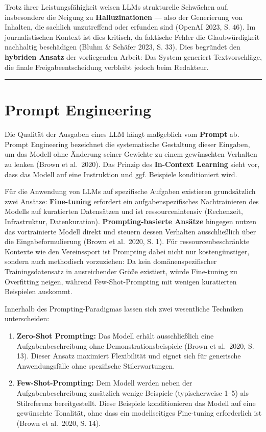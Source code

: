 Trotz ihrer Leistungsfähigkeit weisen LLMs strukturelle Schwächen auf,
insbesondere die Neigung zu \textbf{Halluzinationen} --- also der
Generierung von Inhalten, die sachlich unzutreffend oder erfunden sind
(OpenAI 2023, S. 46). Im journalistischen Kontext ist dies kritisch, da
faktische Fehler die Glaubwürdigkeit nachhaltig beschädigen (Bluhm \&
Schäfer 2023, S. 33). Dies begründet den \textbf{hybriden Ansatz} der
vorliegenden Arbeit: Das System generiert Textvorschläge, die finale
Freigabeentscheidung verbleibt jedoch beim Redakteur.

\begin{center}\rule{0.5\linewidth}{0.5pt}\end{center}

\section{Prompt Engineering}\label{prompt-engineering}

Die Qualität der Ausgaben eines LLM hängt maßgeblich vom \textbf{Prompt}
ab. Prompt Engineering bezeichnet die systematische Gestaltung dieser
Eingaben, um das Modell ohne Änderung seiner Gewichte zu einem
gewünschten Verhalten zu lenken (Brown et al.~2020). Das Prinzip des
\textbf{In-Context Learning} sieht vor, dass das Modell auf eine
Instruktion und ggf. Beispiele konditioniert wird.

Für die Anwendung von LLMs auf spezifische Aufgaben existieren
grundsätzlich zwei Ansätze: \textbf{Fine-tuning} erfordert ein
aufgabenspezifisches Nachtrainieren des Modells auf kuratierten
Datensätzen und ist ressourcenintensiv (Rechenzeit, Infrastruktur,
Datenkuration). \textbf{Prompting-basierte Ansätze} hingegen nutzen das
vortrainierte Modell direkt und steuern dessen Verhalten ausschließlich
über die Eingabeformulierung (Brown et al.~2020, S. 1). Für
ressourcenbeschränkte Kontexte wie den Vereinssport ist Prompting dabei
nicht nur kostengünstiger, sondern auch methodisch vorzuziehen: Da kein
domänenspezifischer Trainingsdatensatz in ausreichender Größe existiert,
würde Fine-tuning zu Overfitting neigen, während Few-Shot-Prompting mit
wenigen kuratierten Beispielen auskommt.

Innerhalb des Prompting-Paradigmas lassen sich zwei wesentliche
Techniken unterscheiden:

\begin{enumerate}
\def\labelenumi{\arabic{enumi}.}
\tightlist
\item
  \textbf{Zero-Shot Prompting:} Das Modell erhält ausschließlich eine
  Aufgabenbeschreibung ohne Demonstrationsbeispiele (Brown et al.~2020,
  S. 13). Dieser Ansatz maximiert Flexibilität und eignet sich für
  generische Anwendungsfälle ohne spezifische Stilerwartungen.
\item
  \textbf{Few-Shot-Prompting:} Dem Modell werden neben der
  Aufgabenbeschreibung zusätzlich wenige Beispiele (typischerweise 1--5)
  als Stilreferenz bereitgestellt. Diese Beispiele konditionieren das
  Modell auf eine gewünschte Tonalität, ohne dass ein modellseitiges
  Fine-tuning erforderlich ist (Brown et al.~2020, S. 14).
\end{enumerate}

